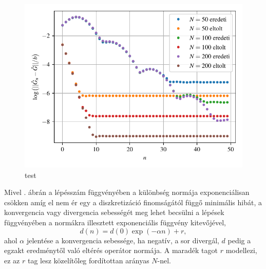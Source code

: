 \begin{figure}[H]
	\centering
	\includegraphics[scale=1]{./figs/convergencerate.pdf}
	\caption[A Green-függvény perturbációs sorának konvergencia sebessége]{test}
	\label{perturbation:covergencerate}
\end{figure}
Mivel . ábrán a lépésszám függvényében a különbség normája exponenciálisan csökken amíg el nem ér egy a diszkretizáció finomságától függő minimális hibát, a konvergencia vagy divergencia sebességét meg lehet becsülni a lépések függvényében a normákra illesztett exponenciális függvény kitevőjével,
\begin{equation}
	d(n) = d(0)\exp(-\alpha n)+r,
	\label{perturbation:fit}
\end{equation}
ahol $\alpha$ jelentése a konvergencia sebessége, ha negatív, a sor divergál, $d$ pedig a egzakt eredménytől való eltérés operátor normája. A maradék tagot $r$ modellezi, ez az $r$ tag lesz közelítőleg fordítottan arányas $N$-nel. 
